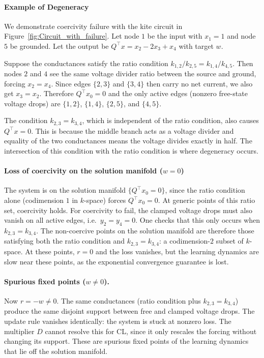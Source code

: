 \documentclass{siamart}
\begin{document}
\paragraph{Example of Degeneracy}

We demonstrate coercivity failure with the kite circuit in Figure~\ref{fig:Circuit_with_failure}. Let node $1$ be the input with $x_1 = 1$ and node $5$ be grounded. Let the output be $Q^\top x = x_2 - 2x_3 + x_4$ with target $w$.

Suppose the conductances satisfy the ratio condition $k_{1,2}/k_{2,5} = k_{1,4}/k_{4,5}$. Then nodes $2$ and $4$ see the same voltage divider ratio between the source and ground, forcing $x_2 = x_4$. Since edges $\{2,3\}$ and $\{3,4\}$ then carry no net current, we also get $x_3 = x_2$. Therefore $Q^\top x_0 = 0$ and the only active edges (nonzero free-state voltage drops) are $\{1,2\}$, $\{1,4\}$, $\{2,5\}$, and $\{4,5\}$.

The condition $k_{2,3} = k_{3,4}$, which is independent of the ratio condition, also causes $Q^\top x = 0$. This is because the middle branch acts as a voltage divider and equality of the two conductances means the voltage divides exactly in half. The intersection of this condition with the ratio condition is where degeneracy occurs.  

\paragraph{Loss of coercivity on the solution manifold ($w = 0$)} The system is on the solution manifold $\{Q^\top x_0 = 0\}$, since the ratio condition alone (codimension $1$ in $k$-space) forces $Q^\top x_0 = 0$. At generic points of this ratio set, coercivity holds. For coercivity to fail, the clamped voltage drops must also vanish on all active edges, i.e.\ $y_2 = y_4 = 0$. One checks that this only occurs when $k_{2,3} = k_{3,4}$. The non-coercive points on the solution manifold are therefore those satisfying both the ratio condition and $k_{2,3} = k_{3,4}$: a codimension-$2$ subset of $k$-space. At these points, $r = 0$ and the loss vanishes, but the learning dynamics are slow near these points, as the exponential convergence guarantee is lost.

\paragraph{Spurious fixed points ($w \neq 0$).} Now $r = -w \neq 0$. The same conductances (ratio condition plus $k_{2,3} = k_{3,4}$) produce the same disjoint support between free and clamped voltage drops. The update rule vanishes identically: the system is stuck at nonzero loss. The multiplier $D$ cannot resolve this for CL, since it only rescales the forcing without changing its support. These are spurious fixed points of the learning dynamics that lie off the solution manifold.
\end{document}
